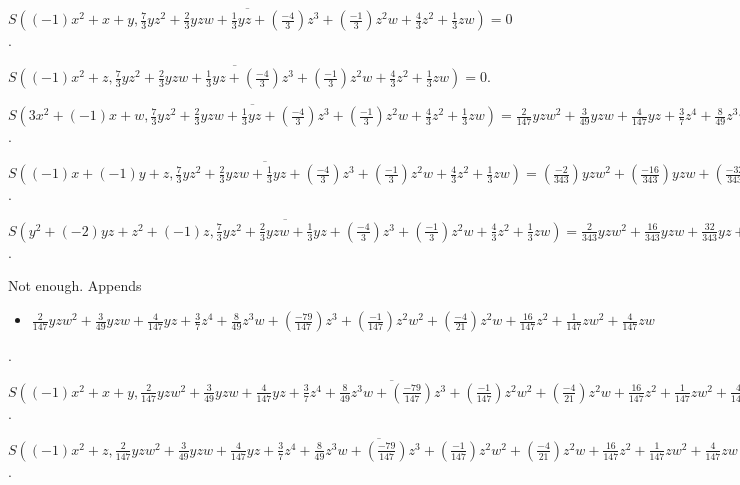 \documentclass{jsarticle}
\begin{document}
$\overline{S((-1)x^{2}+x+y, \frac{7}{3}yz^{2}+\frac{2}{3}yzw+\frac{1}{3}yz+(\frac{-4}{3})z^{3}+(\frac{-1}{3})z^{2}w+\frac{4}{3}z^{2}+\frac{1}{3}zw)} = 0$.  

$\overline{S((-1)x^{2}+z, \frac{7}{3}yz^{2}+\frac{2}{3}yzw+\frac{1}{3}yz+(\frac{-4}{3})z^{3}+(\frac{-1}{3})z^{2}w+\frac{4}{3}z^{2}+\frac{1}{3}zw)} = 0$.  

$\overline{S(3x^{2}+(-1)x+w, \frac{7}{3}yz^{2}+\frac{2}{3}yzw+\frac{1}{3}yz+(\frac{-4}{3})z^{3}+(\frac{-1}{3})z^{2}w+\frac{4}{3}z^{2}+\frac{1}{3}zw)} = \frac{2}{147}yzw^{2}+\frac{3}{49}yzw+\frac{4}{147}yz+\frac{3}{7}z^{4}+\frac{8}{49}z^{3}w+(\frac{-79}{147})z^{3}+(\frac{-1}{147})z^{2}w^{2}+(\frac{-4}{21})z^{2}w+\frac{16}{147}z^{2}+\frac{1}{147}zw^{2}+\frac{4}{147}zw$.  

$\overline{S((-1)x+(-1)y+z, \frac{7}{3}yz^{2}+\frac{2}{3}yzw+\frac{1}{3}yz+(\frac{-4}{3})z^{3}+(\frac{-1}{3})z^{2}w+\frac{4}{3}z^{2}+\frac{1}{3}zw)} = (\frac{-2}{343})yzw^{2}+(\frac{-16}{343})yzw+(\frac{-32}{343})yz+(\frac{-9}{49})z^{4}+(\frac{-24}{343})z^{3}w+\frac{142}{343}z^{3}+\frac{1}{343}z^{2}w^{2}+\frac{8}{49}z^{2}w+(\frac{-79}{343})z^{2}+(\frac{-1}{343})zw^{2}+(\frac{-32}{343})zw$.  

$\overline{S(y^{2}+(-2)yz+z^{2}+(-1)z, \frac{7}{3}yz^{2}+\frac{2}{3}yzw+\frac{1}{3}yz+(\frac{-4}{3})z^{3}+(\frac{-1}{3})z^{2}w+\frac{4}{3}z^{2}+\frac{1}{3}zw)} = \frac{2}{343}yzw^{2}+\frac{16}{343}yzw+\frac{32}{343}yz+\frac{9}{49}z^{4}+\frac{24}{343}z^{3}w+(\frac{-142}{343})z^{3}+(\frac{-1}{343})z^{2}w^{2}+(\frac{-8}{49})z^{2}w+\frac{79}{343}z^{2}+\frac{1}{343}zw^{2}+\frac{32}{343}zw$.  

Not enough.  Appends \begin{itemize}
\item $\frac{2}{147}yzw^{2}+\frac{3}{49}yzw+\frac{4}{147}yz+\frac{3}{7}z^{4}+\frac{8}{49}z^{3}w+(\frac{-79}{147})z^{3}+(\frac{-1}{147})z^{2}w^{2}+(\frac{-4}{21})z^{2}w+\frac{16}{147}z^{2}+\frac{1}{147}zw^{2}+\frac{4}{147}zw$
\end{itemize}  . 


$\overline{S((-1)x^{2}+x+y, \frac{2}{147}yzw^{2}+\frac{3}{49}yzw+\frac{4}{147}yz+\frac{3}{7}z^{4}+\frac{8}{49}z^{3}w+(\frac{-79}{147})z^{3}+(\frac{-1}{147})z^{2}w^{2}+(\frac{-4}{21})z^{2}w+\frac{16}{147}z^{2}+\frac{1}{147}zw^{2}+\frac{4}{147}zw)} = (\frac{-63}{2})z^{5}+(-21)z^{4}w+35z^{4}+(\frac{-7}{2})z^{3}w^{2}+21z^{3}w+(\frac{-7}{2})z^{3}+\frac{7}{2}z^{2}w^{2}$.  

$\overline{S((-1)x^{2}+z, \frac{2}{147}yzw^{2}+\frac{3}{49}yzw+\frac{4}{147}yz+\frac{3}{7}z^{4}+\frac{8}{49}z^{3}w+(\frac{-79}{147})z^{3}+(\frac{-1}{147})z^{2}w^{2}+(\frac{-4}{21})z^{2}w+\frac{16}{147}z^{2}+\frac{1}{147}zw^{2}+\frac{4}{147}zw)} = (\frac{-63}{2})z^{5}+(-21)z^{4}w+35z^{4}+(\frac{-7}{2})z^{3}w^{2}+21z^{3}w+(\frac{-7}{2})z^{3}+\frac{7}{2}z^{2}w^{2}$.  
\end{document}
